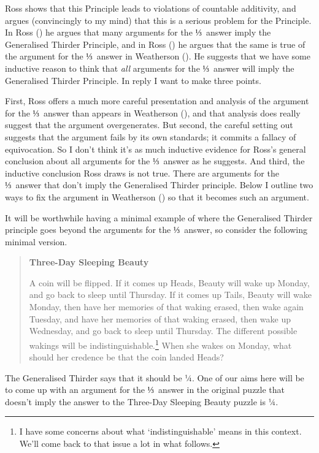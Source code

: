 \documentclass[
  10pt,
  letterpaper,
  DIV=11,
  numbers=noendperiod,
  twoside]{scrartcl}
\begin{document}
Ross shows that this Principle leads to violations of countable
additivity, and argues (convincingly to my mind) that this is a serious
problem for the Principle. In Ross () he
argues that many arguments for the ⅓~answer imply the Generalised
Thirder Principle, and in Ross () he argues
that the same is true of the argument for the ⅓~answer in Weatherson
(). He suggests that we have some
inductive reason to think that \emph{all} arguments for the ⅓~answer
will imply the Generalised Thirder Principle. In reply I want to make
three points.

First, Ross offers a much more careful presentation and analysis of the
argument for the ⅓~answer than appears in Weatherson
(), and that analysis does really
suggest that the argument overgenerates. But second, the careful setting
out suggests that the argument fails by its own standards; it commits a
fallacy of equivocation. So I don't think it's as much inductive
evidence for Ross's general conclusion about all arguments for the
⅓~answer as he suggests. And third, the inductive conclusion Ross draws
is not true. There are arguments for the ⅓~answer that don't imply the
Generalised Thirder principle. Below I outline two ways to fix the
argument in Weatherson () so that it
becomes such an argument.

It will be worthwhile having a minimal example of where the Generalised
Thirder principle goes beyond the arguments for the ⅓~answer, so
consider the following minimal version.

\begin{quote}
\textbf{Three-Day Sleeping Beauty}

A coin will be flipped. If it comes up Heads, Beauty will wake up
Monday, and go back to sleep until Thursday. If it comes up Tails,
Beauty will wake Monday, then have her memories of that waking erased,
then wake again Tuesday, and have her memories of that waking erased,
then wake up Wednesday, and go back to sleep until Thursday. The
different possible wakings will be indistinguishable.\footnote{I have
  some concerns about what `indistinguishable' means in this context.
  We'll come back to that issue a lot in what follows.} When she wakes
on Monday, what should her credence be that the coin landed Heads?
\end{quote}

The Generalised Thirder says that it should be ¼. One of our aims here
will be to come up with an argument for the ⅓~answer in the original
puzzle that doesn't imply the answer to the Three-Day Sleeping Beauty
puzzle is ¼.
\end{document}
